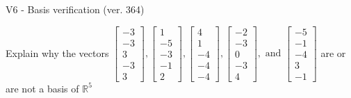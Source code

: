 \begin{exercise}
  \begin{exerciseTitle}V6 - Basis verification (ver. 364)\end{exerciseTitle}
  \begin{exerciseStatement}
    Explain why the vectors \(\left[\begin{array}{r}
-3 \\
-3 \\
3 \\
-3 \\
3
\end{array}\right] , \left[\begin{array}{r}
1 \\
-5 \\
-3 \\
-1 \\
2
\end{array}\right] , \left[\begin{array}{r}
4 \\
1 \\
-4 \\
-4 \\
-4
\end{array}\right] , \left[\begin{array}{r}
-2 \\
-3 \\
0 \\
-3 \\
4
\end{array}\right] , \text{ and } \left[\begin{array}{r}
-5 \\
-1 \\
-4 \\
3 \\
-1
\end{array}\right]\) are or are not a basis of \(\mathbb{R}^5\)	



\end{exerciseStatement}
\end{exercise}
